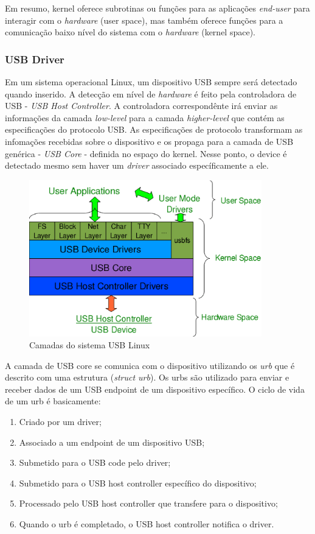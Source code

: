 Em resumo, kernel oferece subrotinas ou funções para as aplicações \textit{end-user} para interagir
com o \textit{hardware} (user space), mas também oferece funções para a comunicação baixo nível do sistema
com o \textit{hardware} (kernel space).

\subsubsection{USB Driver}
\label{driverusb}

Em um sistema operacional Linux, um dispositivo USB sempre será detectado quando inserido.
A detecção em nível de \textit{hardware} é feito pela controladora de USB - \textit{USB Host Controller}. A controladora
correspondênte irá enviar as informações da camada \textit{low-level} para a camada \textit{higher-level} que contém
as especificações do protocolo USB. As especificações de protocolo transformam as infomações recebidas
sobre o dispositivo e os propaga para a camada de USB genérica - \textit{USB Core} - definida no espaço
do kernel. Nesse ponto, o device é detectado mesmo sem haver um \textit{driver} associado específicamente a ele.

\begin{figure}[H]
  \centering
  \includegraphics[width=0.9\textwidth]{figure/usbgeral.eps}
  \caption{Camadas do sistema USB Linux}
  \label{fig:usblinux}
\end{figure}

A camada de USB core se comunica com o dispositivo utilizando os \textit{urb} que é descrito com uma estrutura
(\textit{struct urb}). Os urbs são utilizado para enviar e receber dados de um USB endpoint de um
dispositivo específico. O ciclo de vida de um urb é basicamente:
\begin{enumerate}
  \item Criado por um driver;
  \item Associado a um endpoint de um dispositivo USB;
  \item Submetido para o USB code pelo driver;
  \item Submetido para o USB host controller específico do dispositivo;
  \item Processado pelo USB host controller que transfere para o dispositivo;
  \item Quando o urb é completado, o USB host controller notifica o driver.
\end{enumerate}

